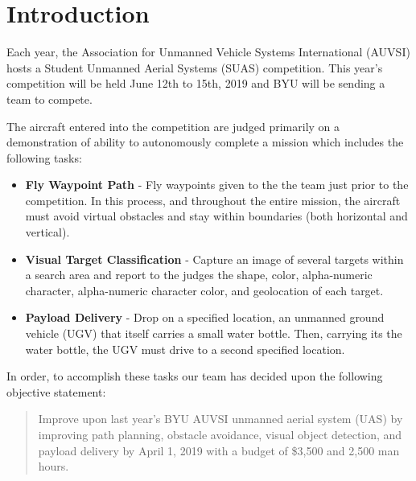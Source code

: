 \documentclass[]{auvsi_doc}
\begin{document}
\begin{AUVSITitlePage}
\begin{artifacttable}
\end{artifacttable}
\end{AUVSITitlePage}


\section{ Introduction}

Each year, the Association for Unmanned Vehicle Systems International (AUVSI) hosts a Student Unmanned Aerial Systems (SUAS) competition. This year’s competition will be held June 12th to 15th, 2019 and BYU will be sending a team to compete.

The aircraft entered into the competition are judged primarily on a demonstration of ability to autonomously complete a mission which includes the following tasks:

\begin{itemize}
	\item\textbf{Fly Waypoint Path} - Fly waypoints given to the the team just prior to the competition. In this process, and throughout the entire mission, the aircraft must avoid virtual obstacles and stay within boundaries (both horizontal and vertical).
	\item\textbf{Visual Target Classification} - Capture an image of several targets within a search area and report to the judges the shape, color, alpha-numeric character, alpha-numeric character color, and geolocation of each target.
	\item\textbf{Payload Delivery} - Drop on a specified location, an unmanned ground vehicle (UGV) that itself carries a small water bottle. Then, carrying its the water bottle, the UGV must drive to a second specified location.
\end{itemize}

In order, to accomplish these tasks our team has decided upon the following objective statement: 
 
\begin{quote}
Improve upon last year’s BYU AUVSI unmanned aerial system (UAS) by improving path planning, obstacle avoidance, visual object detection, and payload delivery by April 1, 2019 with a budget of \$3,500 and 2,500 man hours.
\end{quote}
\end{document}
